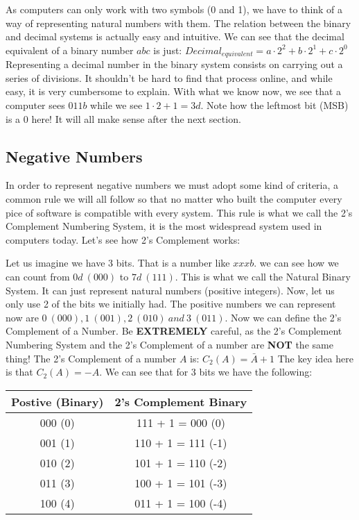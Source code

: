 \documentclass[12pt]{book}
\begin{document}
As computers can only work with two symbols (0 and 1), we have to think of a way of representing natural numbers with them. The relation between the binary and decimal systems is actually easy and intuitive. We can see that  the decimal equivalent of a binary number $abc$ is just: $Decimal_{equivalent} = a·2^2 + b·2^1 + c·2^0$ Representing a decimal number in the binary system consists on carrying out a series of divisions. It shouldn't be hard to find that process online, and while easy, it is very cumbersome to explain. With what we know now, we see that a computer sees $011b$ while we see $1·2 + 1 = 3d$. Note how the leftmost bit (MSB) is a 0 here! It will all make sense after the next section.

\subsection{Negative Numbers}

In order to represent negative numbers we must adopt some kind of criteria, a common rule we will all follow so that no matter who built the computer every pice of software is compatible with every system. This rule is what we call the 2's Complement Numbering System, it is the most widespread system used in computers today. Let's see how 2's Complement works:

Let us imagine we have 3 bits. That is a number like $xxxb$. we can see how we can count from $0d\ (000)$ to $7d\ (111)$. This is what we call the Natural Binary System. It can just represent natural numbers (positive integers). Now, let us only use 2 of the bits we initially had. The positive numbers we can represent now are $0\ (000), 1\ (001), 2\ (010)\ and\ 3\ (011)$. Now we can define the 2's Complement of a Number. Be \textbf{EXTREMELY} careful, as the 2's Complement Numbering System and the 2's Complement of a number are \textbf{NOT} the same thing! The 2's Complement of a number $A$ is: $C_2(A) = \bar{A} + 1$ The key idea here is that $C_2(A) = -A$. We can see that for 3 bits we have the following:

\begin{center}
\begin{tabular}{|c|c|}
  \hline
  Postive (Binary) & 2's Complement Binary \\
  \hline
  000 (0) & 111 + 1 = 000 (0) \\
  001 (1) & 110 + 1 = 111 (-1) \\
  010 (2) & 101 + 1 = 110 (-2) \\
  011 (3) & 100 + 1 = 101 (-3) \\
  100 (4) & 011 + 1 = 100 (-4) \\
  \hline
\end{tabular}
\end{center}
\end{document}
